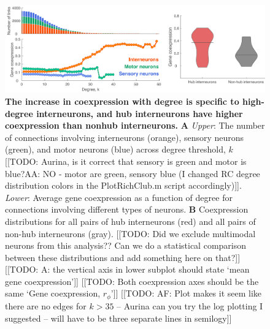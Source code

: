 \documentclass[10pt,letterpaper]{article}
\begin{document}
\begin{figure}[h]
\centering
   \includegraphics[width=1\textwidth]{TypeDegree.pdf}
 \caption{
\textbf{The increase in coexpression with degree is specific to high-degree interneurons, and hub interneurons have higher coexpression than nonhub interneurons.}
\textbf{A} \emph{Upper}: The number of connections involving interneurons (orange), sensory neurons (green), and motor neurons (blue) across degree threshold, $k$ [[TODO: Aurina, is it correct that sensory is green and motor is blue?AA: NO - motor are green, sensory blue (I changed RC degree distribution colors in the PlotRichClub.m script accordingly)]].
\emph{Lower}: Average gene coexpression as a function of degree for connections involving different types of neurons.
\textbf{B} Coexpression distributions for all pairs of hub interneurons (red) and all pairs of non-hub interneurons (gray).
[[TODO: Did we exclude multimodal neurons from this analysis?? Can we do a statistical comparison between these distributions and add something here on that?]]
[[TODO: A: the vertical axis in lower subplot should state `mean gene coexpression']]
[[TODO: Both coexpression axes should be the same `Gene coexpression, $r_\phi$']]
[[TODO: AF: Plot makes it seem like there are no edges for $k>35$ -- Aurina can you try the log plotting I suggested -- will have to be three separate lines in semilogy]]
 \label{fig:interneuron_dep}
}
\end{figure}
\end{document}
